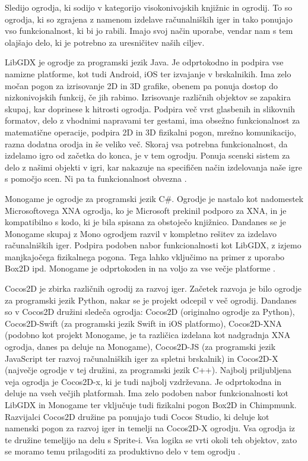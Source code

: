 \documentclass[12pt,a4paper,twoside]{book}
\begin{document}
Sledijo ogrodja, ki sodijo v kategorijo visokonivojskih knjižnic in ogrodij. To so ogrodja, ki so zgrajena z namenom izdelave računalniških iger in tako ponujajo vso funkcionalnost, ki bi jo rabili. Imajo svoj način uporabe, vendar nam s tem olajšajo delo, ki je potrebno za uresničitev naših ciljev.

LibGDX je ogrodje za programski jezik Java. Je odprtokodno in podpira vse namizne platforme, kot tudi Android, iOS ter izvajanje v brskalnikih. Ima zelo močan pogon za izrisovanje 2D in 3D grafike, obenem pa ponuja dostop do nizkonivojskih funkcij, če jih rabimo. Izrisovanje različnih objektov se zapakira skupaj, kar doprinese k hitrosti ogrodja. Podpira več vrst glasbenih in slikovnih formatov, delo z vhodnimi napravami ter gestami, ima obsežno funkcionalnost za matematične operacije, podpira 2D in 3D fizikalni pogon, mrežno komunikacijo, razna dodatna orodja in še veliko več. Skoraj vsa potrebna funkcionalnost, da izdelamo igro od začetka do konca, je v tem ogrodju. Ponuja scenski sistem za delo z našimi objekti v igri, kar nakazuje na specifičen način izdelovanja naše igre s pomočjo scen. Ni pa ta funkcionalnost obvezna \cite{libgdx}.

Monogame je ogrodje za programski jezik C\#. Ogrodje je nastalo kot nadomestek Microsoftovega XNA ogrodja, ko je Microsoft prekinil podporo za XNA, in je kompatibilno s kodo, ki je bila spisana za obstoječo knjižnico. Dandanes se je Monogame skupaj z Mono ogrodjem razvil v kompletno rešitev za izdelavo računalniških iger. Podpira podoben nabor funkcionalnosti kot LibGDX, z izjemo manjkajočega fizikalnega pogona. Tega lahko vključimo na primer z uporabo Box2D ipd. Monogame je odprtokoden in na voljo za vse večje platforme \cite{monogame}.

Cocos2D je zbirka različnih ogrodij za razvoj iger. Začetek razvoja je bilo ogrodje za programski jezik Python, nakar se je projekt odcepil v več ogrodij. Dandanes so v Cocos2D družini sledeča ogrodja: Cocos2D (originalno ogrodje za Python), Cocos2D-Swift (za programski jezik Swift in iOS platformo), Cocos2D-XNA (podobno kot projekt Monogame, je ta različica izdelana kot nadgradnja XNA ogrodja, danes pa deluje na Monogame), Cocos2D-JS (za programski jezik JavaScript ter razvoj računalniških iger za spletni brskalnik) in Cocos2D-X (največje ogrodje v tej družini, za programski jezik C++). Najbolj priljubljena veja ogrodja je Cocos2D-x, ki je tudi najbolj vzdrževana. Je odprtokodna in deluje na vseh večjih platformah. Ima zelo podoben nabor funkcionalnosti kot LibGDX in Monogame ter vključuje tudi fizikalni pogon Box2D in Chimpmunk. Razvijalci Cocos2D družine pa ponujajo tudi Cocos Studio, ki deluje kot namenski pogon za razvoj iger in temelji na Cocos2D-X ogrodju. Vsa ogrodja iz te družine temeljijo na delu s Sprite-i. Vsa logika se vrti okoli teh objektov, zato se moramo temu prilagoditi za produktivno delo v tem ogrodju \cite{cocos2d}\cite{cocos2dx}.
\end{document}
